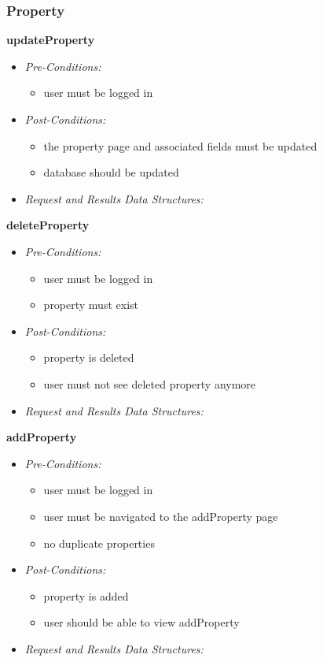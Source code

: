 \documentclass[a4paper,12pt]{article}
\begin{document}
\subsubsection{Property}
\textbf{\large{updateProperty}}
	\begin{itemize}
		\item \textit{Pre-Conditions:}
			\begin{itemize}
				\item user must be logged in 
			\end{itemize}
		\item \textit{Post-Conditions:}
			\begin{itemize}
				\item the property page and associated fields must be updated
				\item database should be updated 
			\end{itemize}
		\item \textit{Request and Results Data Structures:}
	\end{itemize}
\textbf{{deleteProperty}}
	\begin{itemize}
		\item \textit{Pre-Conditions:}
			\begin{itemize}
				\item user must be logged in 
				\item property must exist
			\end{itemize}
		\item \textit{Post-Conditions:}
			\begin{itemize}
				\item property is deleted
				\item user must not see deleted property anymore
			\end{itemize}
		\item \textit{Request and Results Data Structures:}
	\end{itemize}
\textbf{{addProperty}}
	\begin{itemize}
		\item \textit{Pre-Conditions:}
			\begin{itemize}
				\item user must be logged in
				\item user must be navigated to the addProperty page 
				\item no duplicate properties
			\end{itemize}
		\item \textit{Post-Conditions:}
			\begin{itemize}
				\item property is added
				\item user should be able to view addProperty
			\end{itemize}
		\item \textit{Request and Results Data Structures:}
	\end{itemize}
\end{document}
